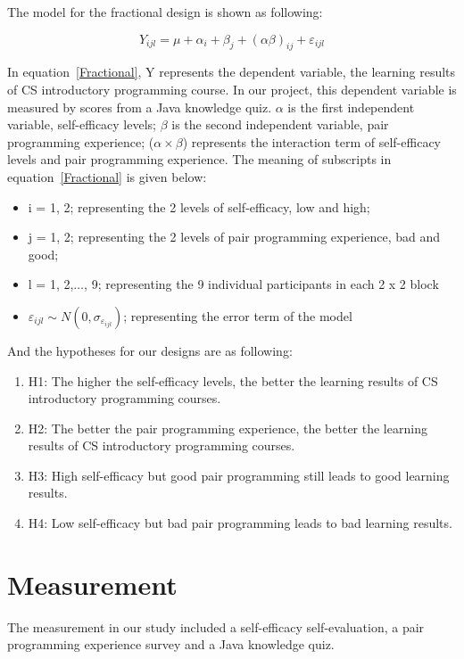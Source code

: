 \documentclass{sigchi}
\begin{document}
The model for the fractional design is shown as following:

\begin{equation}
\label{Fractional}
Y_{ijl} = \mu + \alpha_i + \beta_j + (\alpha \beta)_{ij} + \varepsilon_{ijl}
\end{equation}

In equation~\eqref{Fractional}, Y represents the dependent variable, the learning results of CS introductory programming course. In our project, this dependent variable is measured by scores from a Java knowledge quiz. $\alpha$ is the first independent variable, self-efficacy levels;  $\beta$ is the second independent variable, pair programming experience; ($\alpha \times \beta$) represents the interaction term of self-efficacy levels and pair programming experience. The meaning of subscripts in equation~\eqref{Fractional} is given below:

\begin{itemize}
\item i = 1, 2; representing the 2 levels of self-efficacy, low and high; 
\item j = 1, 2; representing the 2 levels of pair programming experience, bad and good;
\item l = 1, 2,$\dots$, 9; representing the 9 individual participants in each 2 x 2 block
\item $\varepsilon_{ijl} \sim  N(0, \sigma_{\varepsilon_{ijl}})$; representing the error term of the model
\end{itemize}

And the hypotheses for our designs are as following:

\begin{enumerate}
\item H1: The higher the self-efficacy levels, the better the learning results of CS introductory programming courses. 
\item H2: The better the pair programming experience, the better the learning results of CS introductory programming courses. 
\item H3: High self-efficacy but good pair programming still leads to good learning results.
\item H4: Low self-efficacy but bad pair programming leads to bad learning results.
\end{enumerate}


\section{Measurement}
The measurement in our study included a self-efficacy self-evaluation, a pair programming experience survey and a Java knowledge quiz.
\end{document}
